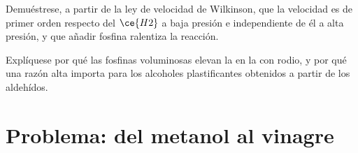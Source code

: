 \begin{exercise}[$\star\star\star$]\label{exo:b3:homogeneous-catalysis:11}
Demuéstrese, a partir de la ley de velocidad de Wilkinson, que la velocidad es de primer orden respecto del $\ce{H2}$ a baja presión
e independiente de él a alta presión, y que añadir fosfina ralentiza la
reacción.
\end{exercise}

\begin{exercise}[$\star\star\star$]\label{exo:b3:homogeneous-catalysis:12}
Explíquese por qué las fosfinas voluminosas elevan la  en la
 con rodio, y por qué una razón alta importa para los alcoholes plastificantes obtenidos
a partir de los aldehídos.
\end{exercise}

\section{Problema: del metanol al vinagre}

